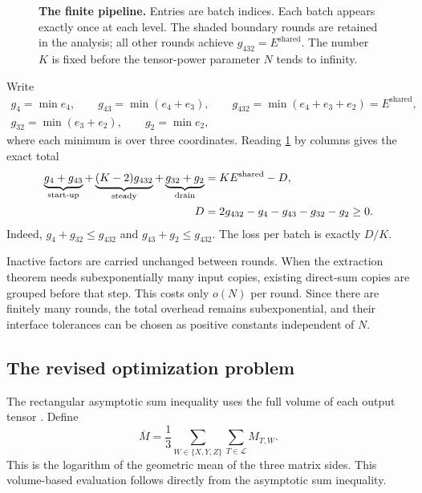 \documentclass[11pt,a4paper]{article}
\newcommand{\Eshared}{E^{\mathrm{shared}}}
\newcommand{\Mbar}{\overline M}
\newcommand{\WW}{\{X,Y,Z\}}
\begin{document}
\begin{figure}[t]
\centering

\caption{\textbf{The finite pipeline.} Entries are batch indices. Each batch appears exactly once at each level. The shaded boundary rounds are retained in the analysis; all other rounds achieve $g_{432}=\Eshared$. The number $K$ is fixed before the tensor-power parameter $N$ tends to infinity.}
\label{fig:pipeline}
\end{figure}

Write
\begin{equation}\label{eq:round-rates}
\begin{gathered}
g_4=\min e_4,\qquad g_{43}=\min(e_4+e_3),\qquad
 g_{432}=\min(e_4+e_3+e_2)=\Eshared,\\
g_{32}=\min(e_3+e_2),\qquad g_2=\min e_2,
\end{gathered}
\end{equation}
where each minimum is over three coordinates. Reading \cref{fig:pipeline} by columns gives the exact total
\begin{align}
\underbrace{g_4+g_{43}}_{\text{\upshape start-up}}
+\underbrace{(K-2)g_{432}}_{\text{\upshape steady}}
+\underbrace{g_{32}+g_2}_{\text{\upshape drain}}
&=K\Eshared-D,\label{eq:pipeline-total}\\
D&=2g_{432}-g_4-g_{43}-g_{32}-g_2\ge0.\label{eq:boundary}
\end{align}
Indeed, $g_4+g_{32}\le g_{432}$ and $g_{43}+g_2\le g_{432}$. The loss per batch is exactly $D/K$.

Inactive factors are carried unchanged between rounds. When the extraction theorem needs subexponentially many input copies, existing direct-sum copies are grouped before that step. This costs only $o(N)$ per round. Since there are finitely many rounds, the total overhead remains subexponential, and their interface tolerances can be chosen as positive constants independent of $N$.

\subsection{The revised optimization problem}

The rectangular asymptotic sum inequality uses the full volume of each output tensor \citep{schonhage1981}. Define
\begin{equation}\label{eq:mbar}
\Mbar=\frac13\sum_{W\in\WW}\sum_{T\in\mathcal L}M_{T,W}.
\end{equation}
This is the logarithm of the geometric mean of the three matrix sides. This volume-based evaluation follows directly from the asymptotic sum inequality.
\end{document}
